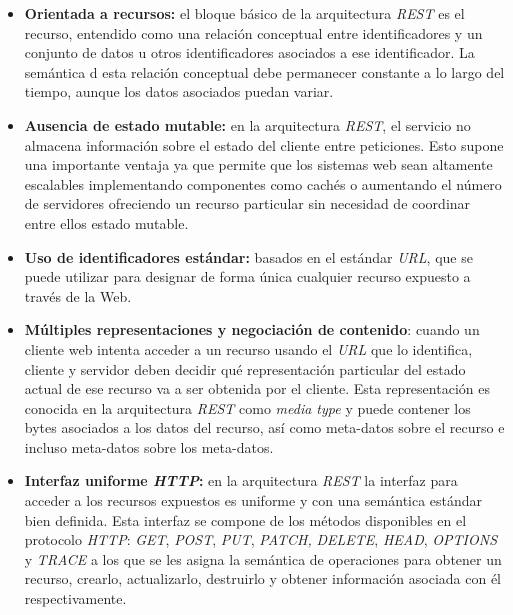 \begin{itemize}
\item \textbf{Orientada a recursos:} el bloque b\'asico de la arquitectura \textit{REST} es el recurso, entendido como una relaci\'on conceptual entre identificadores y un conjunto de datos u otros identificadores asociados a ese identificador. La sem\'antica d esta relaci\'on conceptual debe permanecer constante a lo largo del tiempo, aunque los datos asociados puedan variar.

\item \textbf{Ausencia de estado mutable:} en la arquitectura \textit{REST}, el servicio no almacena informaci\'on sobre el estado del cliente entre peticiones. Esto supone una importante ventaja ya que permite que los sistemas web sean altamente escalables implementando componentes como cach\'es o aumentando el n\'umero de servidores ofreciendo un recurso particular sin necesidad de coordinar entre ellos estado mutable.

\item \textbf{Uso de identificadores est\'andar:} basados en el est\'andar \textit{URL}, que se puede utilizar para designar de forma \'unica cualquier recurso expuesto a trav\'es de la Web.

\item \textbf{M\'ultiples representaciones y negociaci\'on de contenido}: cuando un cliente web intenta acceder a un recurso usando el \textit{URL} que lo identifica, cliente y servidor deben decidir qu\'e representaci\'on particular del estado actual de ese recurso va a ser obtenida por el cliente. Esta representaci\'on es conocida en la arquitectura \textit{REST} como \textit{media type} y puede contener los bytes asociados a los datos del recurso, as\'i como meta-datos sobre el recurso e incluso meta-datos sobre los meta-datos.

\item \textbf{Interfaz uniforme \textit{HTTP}:} en la arquitectura \textit{REST} la interfaz para acceder a los recursos expuestos es uniforme y con una sem\'antica est\'andar bien definida. Esta interfaz se compone de los m\'etodos disponibles en el protocolo \textit{HTTP}: \textit{GET}, \textit{POST}, \textit{PUT}, \textit{PATCH, }\textit{DELETE}, \textit{HEAD}, \textit{OPTIONS} y \textit{TRACE} a los que se les asigna la sem\'antica de operaciones para obtener un recurso, crearlo, actualizarlo, destruirlo y obtener informaci\'on asociada con \'el respectivamente.

\end{itemize}



